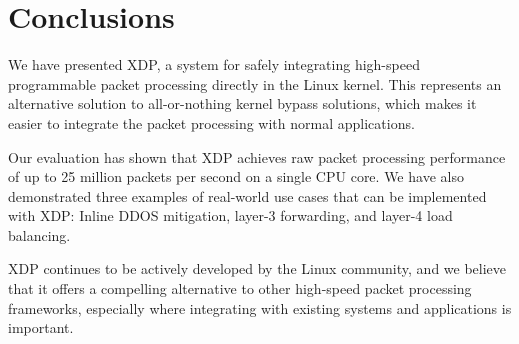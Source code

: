 \documentclass[10pt,sigconf]{acmart}
\begin{document}
\section{Conclusions}
\label{sec:conclusion}
We have presented XDP, a system for safely integrating high-speed programmable
packet processing directly in the Linux kernel. This represents an alternative
solution to all-or-nothing kernel bypass solutions, which makes it easier to
integrate the packet processing with normal applications.

Our evaluation has shown that XDP achieves raw packet processing performance of
up to 25 million packets per second on a single CPU core. We have also
demonstrated three examples of real-world use cases that can be implemented with
XDP: Inline DDOS mitigation, layer-3 forwarding, and layer-4 load balancing.

XDP continues to be actively developed by the Linux community, and we believe
that it offers a compelling alternative to other high-speed packet processing
frameworks, especially where integrating with existing systems and applications
is important.



\end{document}
